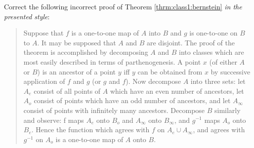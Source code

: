 \begin{exercise}
    Correct the following incorrect proof of Theorem \ref{thrm:class1:bernstein} \emph{in the presented style}:
    \begin{quote}
Suppose that $f$ is a one-to-one map of $A$ into $B$ and $g$ is
one-to-one on $B$ to $A$. It may be supposed that $A$ and $B$ are disjoint. The proof of the theorem is accomplished by decomposing $A$ and $B$ into classes which are most easily described in terms of parthenogenesis. A point $x$ (of either $A$ or $B$) is an ancestor of a point $y$ iff $y$ can be obtained from $x$ by successive application of $f$ and $g$ (or $g$ and $f$). Now decompose $A$ into three sets:
let $A_e$ consist of all points of $A$ which have an even number of ancestors, let $A_o$ consist of points which have an odd number of ancestors, and let $A_{\infty}$ consist of points with infinitely many ancestors. Decompose $B$ similarly and observe: f maps $A_e$ onto
$B_o$ and $A_{\infty}$ onto  $B_{\infty}$, and $g^{-1}$ maps $A_o$ onto $B_e$. Hence the function which agrees with $f$ on $A_e\cup A_{\infty}$, and agrees with $g^{-1}$ on $A_o$ is a one-to-one map of $A$ onto $B$.
    \end{quote}
\end{exercise}

